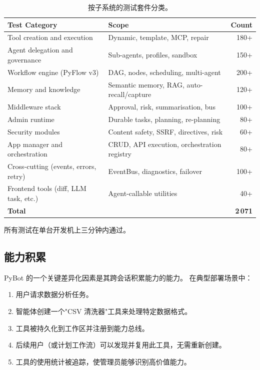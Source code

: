 \documentclass[11pt,a4paper]{article}
\begin{document}
\begin{table}[h]
\centering
\small
\begin{tabularx}{\textwidth}{Xlr}
\toprule
\textbf{Test Category} & \textbf{Scope} & \textbf{Count} \\
\midrule
Tool creation and execution & Dynamic, template, MCP, repair & 180+ \\
Agent delegation and governance & Sub-agents, profiles, sandbox & 150+ \\
Workflow engine (PyFlow v3) & DAG, nodes, scheduling, multi-agent & 200+ \\
Memory and knowledge & Semantic memory, RAG, auto-recall/capture & 120+ \\
Middleware stack & Approval, risk, summarisation, bus & 100+ \\
Admin runtime & Durable tasks, planning, re-planning & 80+ \\
Security modules & Content safety, SSRF, directives, risk & 60+ \\
App manager and orchestration & CRUD, API execution, orchestration registry & 80+ \\
Cross-cutting (events, errors, retry) & EventBus, diagnostics, failover & 100+ \\
Frontend tools (diff, LLM task, etc.) & Agent-callable utilities & 40+ \\
\midrule
\textbf{Total} & & \textbf{2\,071} \\
\bottomrule
\end{tabularx}
\caption{按子系统的测试套件分类。}
\label{tab:tests}
\end{table}

所有测试在单台开发机上三分钟内通过。

\subsection{能力积累}

PyBot 的一个关键差异化因素是其跨会话积累能力的能力。
在典型部署场景中：
\begin{enumerate}
  \item 用户请求数据分析任务。
  \item 智能体创建一个"CSV 清洗器"工具来处理特定数据格式。
  \item 工具被持久化到工作区并注册到能力总线。
  \item 后续用户（或计划工作流）可以发现并复用此工具，无需重新创建。
  \item 工具的使用统计被追踪，使管理员能够识别高价值能力。
\end{enumerate}
\end{document}
